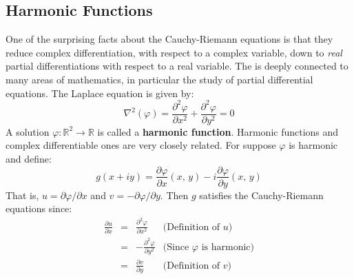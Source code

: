 \documentclass{article}
\theoremstyle{definition}
\begin{document}
        \subsection{Harmonic Functions}
            One of the surprising facts about the Cauchy-Riemann equations
            is that they reduce complex differentiation, with respect to a
            complex variable, down to \textit{real} partial differentiations
            with respect to a real variable. The is deeply connected to many
            areas of mathematics, in particular the study of partial
            differential equations. The Laplace equation is given by:
            \begin{equation}
                \nabla^{2}(\varphi)
                =\frac{\partial^{2}\varphi}{\partial{x}^{2}}
                +\frac{\partial^{2}\varphi}{\partial{y}^{2}}
                =0
            \end{equation}
            A solution $\varphi:\mathbb{R}^{2}\rightarrow\mathbb{R}$ is called
            a \textbf{harmonic function}. Harmonic functions and complex
            differentiable ones are very closely related. For suppose
            $\varphi$ is harmonic and define:
            \begin{equation}
                g(x+iy)
                =\frac{\partial\varphi}{\partial{x}}(x,\,y)
                -i\frac{\partial\varphi}{\partial{y}}(x,\,y)
            \end{equation}
            That is, $u=\partial\varphi/\partial{x}$ and
            $v=-\partial\varphi/\partial{y}$.
            Then $g$ satisfies the Cauchy-Riemann equations since:
            \begin{equation}
                \begin{array}{rcll}
                    \displaystyle
                    \frac{\partial{u}}{\partial{x}}
                    &=&
                    \displaystyle
                    \frac{\partial^{2}\varphi}{\partial{x}^{2}}
                    &
                    \textrm{(Definition of $u$)}\\[2em]
                    &=&
                    \displaystyle
                    -\frac{\partial^{2}\varphi}{\partial{y}^{2}}
                    &
                    \textrm{(Since $\varphi$ is harmonic)}\\[2em]
                    &=&
                    \displaystyle
                    \frac{\partial{v}}{\partial{y}}
                    &
                    \textrm{(Definition of $v$)}
                \end{array}
            \end{equation}
\end{document}
